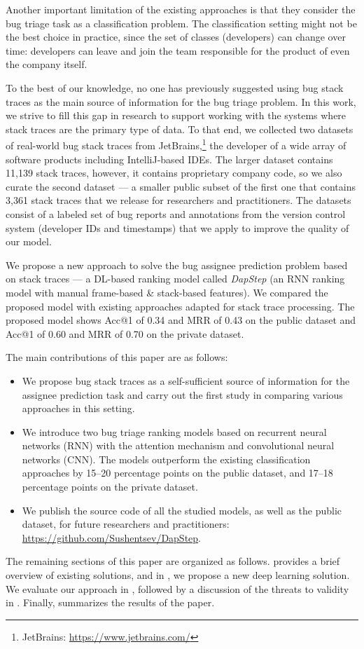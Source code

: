Another important limitation of the existing approaches is that they consider the bug triage task as a classification problem. The classification setting might not be the best choice in practice, since the set of classes (developers) can change over time: developers can leave and join the team responsible for the product of even the company itself. 

To the best of our knowledge, no one has previously suggested using bug stack traces as the main source of information for the bug triage problem. In this work, we strive to fill this gap in research to support working with the systems where stack traces are the primary type of data. To that end, we collected two datasets of real-world bug stack traces from JetBrains,\footnote{JetBrains: \url{https://www.jetbrains.com/}} the developer of a wide array of software products including IntelliJ-based IDEs. The larger dataset contains 11,139 stack traces, however, it contains proprietary company code, so we also curate the second dataset --- a smaller public subset of the first one that contains 3,361 stack traces that we release for researchers and practitioners. The datasets consist of a labeled set of bug reports and annotations from the version control system (developer IDs and timestamps) that we apply to improve the quality of our model.

We propose a new approach to solve the bug assignee prediction problem based on stack traces --- a DL-based ranking model called \textit{DapStep} (an RNN ranking model with manual frame-based \& stack-based features). We compared the proposed model with existing approaches adapted for stack trace processing. The proposed model shows Acc@1 of 0.34 and MRR of 0.43 on the public dataset and Acc@1 of 0.60 and MRR of 0.70 on the private dataset.

The main contributions of this paper are as follows:
\begin{itemize}
    \item We propose bug stack traces as a self-sufficient source of information for the assignee prediction task and carry out the first study in comparing various approaches in this setting.
    \item We introduce two bug triage ranking models based on recurrent neural networks (RNN) with the attention mechanism and convolutional neural networks (CNN). The models outperform the existing classification approaches by
    15--20 percentage points on the public dataset, and 17--18 percentage points on the private dataset.
    \item We publish the source code of all the studied models, as well as the public dataset, for future researchers and practitioners: \url{https://github.com/Sushentsev/DapStep}.
\end{itemize}

The remaining sections of this paper are organized as follows.  provides a brief overview of existing solutions, and in , we propose a new deep learning solution. We evaluate our approach in , followed by a discussion of the threats to validity in . Finally,  summarizes the results of the paper.